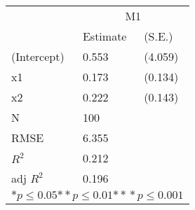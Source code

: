 \begin{tabular}{*{3}{l}}
\hline
                  & \multicolumn{2}{c}{M1}   \tabularnewline
                   &Estimate  &(S.E.)  \tabularnewline
 \hline
 \hline
   (Intercept)     &0.553   &   (4.059) \tabularnewline
   x1              &0.173   &   (0.134) \tabularnewline
   x2              &0.222   &   (0.143) \tabularnewline
 \hline
 N                 &100       &        \tabularnewline
 RMSE             &6.355         & \tabularnewline
 $R^2$             &0.212         & \tabularnewline
 adj $R^2$         &0.196         & \tabularnewline
 \hline
\hline
 
 \multicolumn{3}{c}{${*  p}\le 0.05$${*\!\!*  p}\le 0.01$${*\!\!*\!\!*  p}\le 0.001$}\tabularnewline
 \end{tabular}